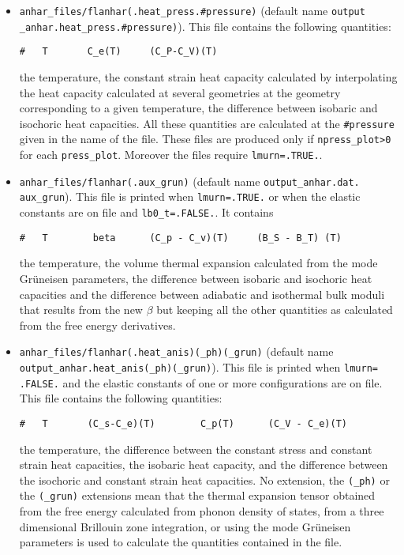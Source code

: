 \documentclass[12pt,a4paper,twoside]{report}
\begin{document}
\begin{itemize}
\item 
\texttt{anhar\_files/flanhar(.heat\_press.\#pressure)}
(default name \texttt{output} \texttt{\_anhar.heat\_press.\#pressure)}). 
This file contains the following quantities:
\begin{verbatim}
#   T       C_e(T)     (C_P-C_V)(T)    
\end{verbatim}
the temperature, the constant strain heat capacity calculated 
by interpolating the heat capacity calculated at several geometries 
at the geometry corresponding to a given temperature, the
difference between isobaric and isochoric heat capacities. 
All these quantities are calculated at the \texttt{\#pressure} given
in the name of the file.
These files are produced only if \texttt{npress\_plot>0} for each
\texttt{press\_plot}. Moreover the files require \texttt{lmurn=.TRUE.}.

\item 
\texttt{anhar\_files/flanhar(.aux\_grun)} 
(default name \texttt{output\_anhar.dat.} \texttt{aux\_grun}). 
This file is printed
when \texttt{lmurn=.TRUE.} or when the elastic
constants are on file and \texttt{lb0\_t=.FALSE.}. It contains
\begin{verbatim}
#   T        beta      (C_p - C_v)(T)     (B_S - B_T) (T)
\end{verbatim}
the temperature, the volume thermal expansion calculated from the mode 
Gr\"uneisen parameters, the difference
between isobaric and isochoric heat capacities and the difference between
adiabatic and isothermal bulk moduli that results
from the new $\beta$ but keeping all the other quantities as calculated
from the free energy derivatives. 

\item 
\texttt{anhar\_files/flanhar(.heat\_anis)(\_ph)(\_grun)} 
(default name \\ \texttt{output\_anhar.heat\_anis(\_ph)(\_grun)}). 
This file is printed when \texttt{lmurn=} \texttt{.FALSE.} and  the elastic
constants of one or more configurations are on file.
This file contains the following quantities:
\begin{verbatim}
#   T       (C_s-C_e)(T)        C_p(T)      (C_V - C_e)(T)    
\end{verbatim}
the temperature, the difference between the constant stress and constant
strain heat capacities, the isobaric heat capacity, and the difference
between the isochoric and constant strain heat capacities. 
No extension, the \texttt{(\_ph)} or the \texttt{(\_grun)}
extensions mean that the thermal expansion tensor obtained from the
free energy calculated from phonon density of states,
from a three dimensional Brillouin zone integration, or using the
mode Gr\"uneisen parameters is used to calculate the quantities 
contained in the file.


\end{itemize}
\end{document}

